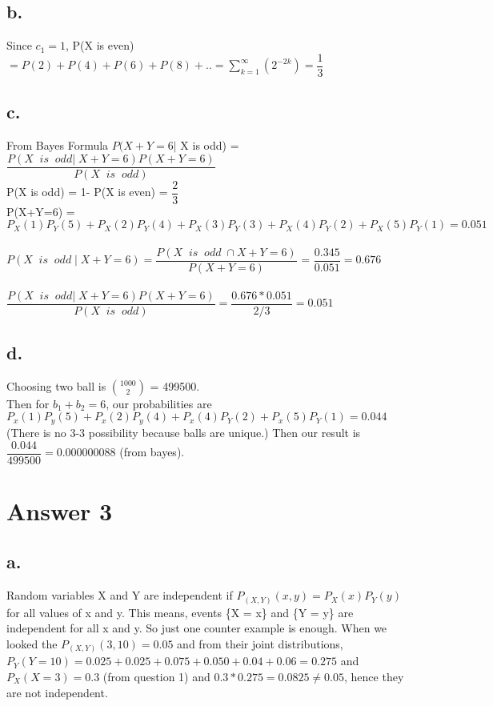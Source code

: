 \documentclass[12pt]{article}
\begin{document}
\subsection*{b.}
Since $c_1 = 1$, P(X is even)$= P(2)+P(4)+P(6)+P(8)+..= \sum_{k=1}^{\infty}(2^{-2k}) =\dfrac{1}{3}$
\subsection*{c.}
From Bayes Formula $P(X+Y=6 | $ X is odd) = $\dfrac{P(X  \; \;is\; \; odd | \; X+Y=6 )P(X+Y=6)}{P(X \; \; is \; \;odd )}$ \\
P(X is odd) = 1- P(X is even) = $\dfrac{2}{3}$ \\
P(X+Y=6) = $P_X(1)P_Y(5)+P_X(2)P_Y(4)+P_X(3)P_Y(3)+P_X(4)P_Y(2)+P_X(5)P_Y(1) = 0.051$ \\ \\
$P(X \; \;is\; \; odd \; | \; X+Y=6 ) = \dfrac{P(X \; \;is\; \; odd \; \cap X+Y=6 )}{P(X+Y=6)}$ = $\dfrac{0.345}{0.051}=0.676$ \\ \\
$\dfrac{P(X  \; \;is\; \; odd | \; X+Y=6 )P(X+Y=6)}{P(X \; \; is \; \;odd )} = \dfrac{0.676*0.051}{2/3} = 0.051$
\subsection*{d.}
Choosing two ball is ${1000}\choose{2}$ = 499500. \\
Then for $b_1+b_2=6$, our probabilities are $P_x(1)P_y(5)+P_x(2)P_y(4)+P_x(4)P_Y(2)+P_x(5)P_Y(1)=0.044$ (There is no 3-3 possibility because balls are unique.) 
Then our result is $\dfrac{0.044}{499500}=0.000000088$ (from bayes).
\section*{Answer 3}

\subsection*{a.}
Random variables X and Y are independent if $P_{(X,Y)}(x,y) = P_X(x)P_Y(y)$ for all values of x and y. This means, events \{X = x\} and \{Y = y\} are independent for all x and y. So just one counter example is enough. When we looked the $P_{(X,Y)}(3,10) = 0.05$ and from their joint distributions, $P_Y(Y=10) = 0.025+0.025+0.075+0.050+0.04+0.06 = 0.275$ and $P_X(X=3) = 0.3$ (from question 1) and $0.3*0.275 = 0.0825 \neq 0.05$, hence they are not independent.
\end{document}
